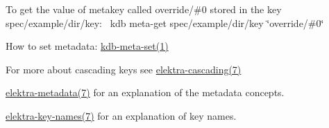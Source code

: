 To get the value of metakey called {\ttfamily override/\#0} stored in the key {\ttfamily spec/example/dir/key}\+:~\newline
 {\ttfamily kdb meta-\/get spec/example/dir/key \char`\"{}override/\#0\char`\"{}}


\begin{DoxyItemize}
\item How to set metadata\+: \mbox{\hyperlink{doc_help_kdb-meta-set_md}{kdb-\/meta-\/set(1)}}
\item For more about cascading keys see \mbox{\hyperlink{doc_help_elektra-cascading_md}{elektra-\/cascading(7)}}
\item \mbox{\hyperlink{doc_help_elektra-metadata_md}{elektra-\/metadata(7)}} for an explanation of the metadata concepts.
\item \mbox{\hyperlink{doc_help_elektra-key-names_md}{elektra-\/key-\/names(7)}} for an explanation of key names. 
\end{DoxyItemize}